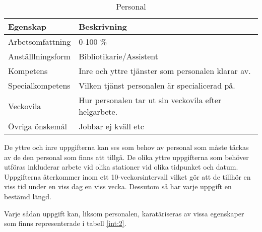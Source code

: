 \begin{table}[h]
\centering
\caption{Personal}
\label{int:1}
\begin{tabular}{|l|l|}
\hline 
\textbf{Egenskap} & \textbf{Beskrivning} \\ \hline
Arbetsomfattning & 0-100 \% 
\\ \hline 
Anställlningsform & Bibliotikarie/Assistent
\\ \hline 
Kompetens & Inre och yttre tjänster som personalen klarar av.  
\\ \hline 
Specialkompetens & Vilken tjänst personalen är specialicerad på.
\\ \hline 
Veckovila & Hur personalen tar ut sin veckovila efter helgarbete.
\\ \hline 
Övriga önskemål & Jobbar ej kväll etc
\\ \hline 
\end{tabular}
\end{table}


De yttre och inre uppgifterna kan ses som behov av personal som måste täckas av de den personal som finns att tillgå. De olika yttre uppgifterna som behöver utföras inkluderar arbete vid olika stationer vid olika tidpunket och datum. Uppgifterna återkommer inom ett 10-veckorsintervall vilket gör att de tillhör en viss tid under en viss dag en viss vecka. Dessutom så har varje uppgift en bestämd längd.   

Varje sådan uppgift kan, liksom personalen, karatäriseras av vissa egenskaper som finns representerade i tabell \ref{int:2}. \\

